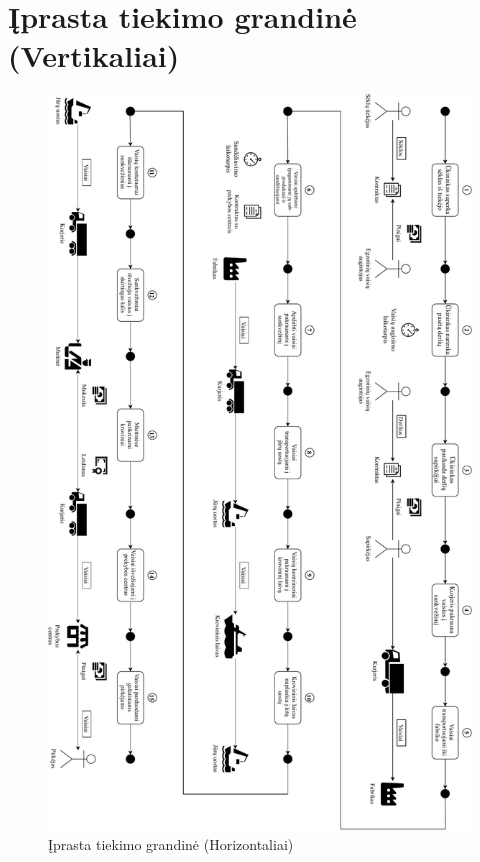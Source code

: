 \appendix  

\section{Įprasta tiekimo grandinė (Vertikaliai)}
\begin{figure}[H]
    \centering
    \includegraphics[scale=0.50]{images/supply-chain-vertical}
    \caption{Įprasta tiekimo grandinė (Horizontaliai)}
\end{figure}


